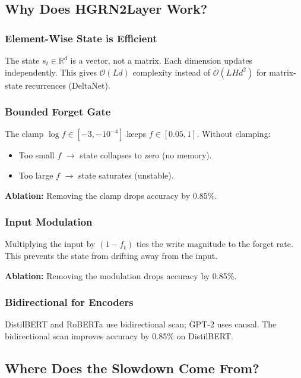 \subsection{Why Does HGRN2Layer Work?}

\subsubsection{Element-Wise State is Efficient}

The state $s_t \in \mathbb{R}^d$ is a vector, not a matrix. Each dimension 
updates independently. This gives $\mathcal{O}(L d)$ complexity instead of 
$\mathcal{O}(L H d^2)$ for matrix-state recurrences (DeltaNet).

\subsubsection{Bounded Forget Gate}

The clamp $\log f \in [-3, -10^{-4}]$ keeps $f \in [0.05, 1]$. Without 
clamping:

\begin{itemize}
\item Too small $f$ $\to$ state collapses to zero (no memory).
\item Too large $f$ $\to$ state saturates (unstable).

\end{itemize}
\textbf{Ablation:} Removing the clamp drops accuracy by 0.85\%.

\subsubsection{Input Modulation}

Multiplying the input by $(1 - f_t)$ ties the write magnitude to the forget 
rate. This prevents the state from drifting away from the input.

\textbf{Ablation:} Removing the modulation drops accuracy by 0.85\%.

\subsubsection{Bidirectional for Encoders}

DistilBERT and RoBERTa use bidirectional scan; GPT-2 uses causal. The 
bidirectional scan improves accuracy by 0.85\% on DistilBERT.

\subsection{Where Does the Slowdown Come From?}

